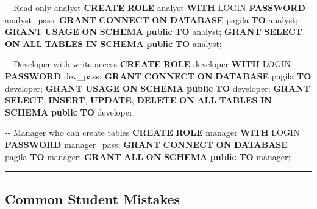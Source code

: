 \documentclass[
  letterpaper,
  DIV=11,
  numbers=noendperiod]{scrartcl}
\newenvironment{Shaded}{\begin{snugshade}}{\end{snugshade}}
\newcommand{\CommentTok}[1]{\textcolor[rgb]{0.37,0.37,0.37}{#1}}
\newcommand{\KeywordTok}[1]{\textcolor[rgb]{0.00,0.23,0.31}{\textbf{#1}}}
\newcommand{\NormalTok}[1]{\textcolor[rgb]{0.00,0.23,0.31}{#1}}
\newcommand{\StringTok}[1]{\textcolor[rgb]{0.13,0.47,0.30}{#1}}
\begin{document}
\begin{Shaded}
\begin{Highlighting}[]
\CommentTok{{-}{-} Read{-}only analyst}
\KeywordTok{CREATE} \KeywordTok{ROLE}\NormalTok{ analyst }\KeywordTok{WITH}\NormalTok{ LOGIN }\KeywordTok{PASSWORD} \StringTok{\textquotesingle{}analyst\_pass\textquotesingle{}}\NormalTok{;}
\KeywordTok{GRANT} \KeywordTok{CONNECT} \KeywordTok{ON} \KeywordTok{DATABASE}\NormalTok{ pagila }\KeywordTok{TO}\NormalTok{ analyst;}
\KeywordTok{GRANT} \KeywordTok{USAGE} \KeywordTok{ON} \KeywordTok{SCHEMA} \KeywordTok{public} \KeywordTok{TO}\NormalTok{ analyst;}
\KeywordTok{GRANT} \KeywordTok{SELECT} \KeywordTok{ON} \KeywordTok{ALL} \KeywordTok{TABLES} \KeywordTok{IN} \KeywordTok{SCHEMA} \KeywordTok{public} \KeywordTok{TO}\NormalTok{ analyst;}

\CommentTok{{-}{-} Developer with write access}
\KeywordTok{CREATE} \KeywordTok{ROLE}\NormalTok{ developer }\KeywordTok{WITH}\NormalTok{ LOGIN }\KeywordTok{PASSWORD} \StringTok{\textquotesingle{}dev\_pass\textquotesingle{}}\NormalTok{;}
\KeywordTok{GRANT} \KeywordTok{CONNECT} \KeywordTok{ON} \KeywordTok{DATABASE}\NormalTok{ pagila }\KeywordTok{TO}\NormalTok{ developer;}
\KeywordTok{GRANT} \KeywordTok{USAGE} \KeywordTok{ON} \KeywordTok{SCHEMA} \KeywordTok{public} \KeywordTok{TO}\NormalTok{ developer;}
\KeywordTok{GRANT} \KeywordTok{SELECT}\NormalTok{, }\KeywordTok{INSERT}\NormalTok{, }\KeywordTok{UPDATE}\NormalTok{, }\KeywordTok{DELETE} \KeywordTok{ON} \KeywordTok{ALL} \KeywordTok{TABLES} \KeywordTok{IN} \KeywordTok{SCHEMA} \KeywordTok{public} \KeywordTok{TO}\NormalTok{ developer;}

\CommentTok{{-}{-} Manager who can create tables}
\KeywordTok{CREATE} \KeywordTok{ROLE}\NormalTok{ manager }\KeywordTok{WITH}\NormalTok{ LOGIN }\KeywordTok{PASSWORD} \StringTok{\textquotesingle{}manager\_pass\textquotesingle{}}\NormalTok{;}
\KeywordTok{GRANT} \KeywordTok{CONNECT} \KeywordTok{ON} \KeywordTok{DATABASE}\NormalTok{ pagila }\KeywordTok{TO}\NormalTok{ manager;}
\KeywordTok{GRANT} \KeywordTok{ALL} \KeywordTok{ON} \KeywordTok{SCHEMA} \KeywordTok{public} \KeywordTok{TO}\NormalTok{ manager;}
\end{Highlighting}
\end{Shaded}

\begin{center}\rule{0.5\linewidth}{0.5pt}\end{center}

\subsection{Common Student Mistakes}\label{common-student-mistakes}
\end{document}
